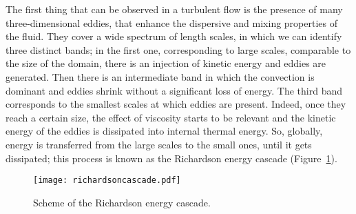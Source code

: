 The first thing that can be observed in a turbulent flow is the presence of 
many three-dimensional eddies, that enhance the dispersive and mixing 
properties 
of the fluid. 
They cover a wide spectrum of length scales, in which we can identify 
three distinct bands; in the first one, corresponding to large scales, 
comparable to the size of the domain, there is an injection of kinetic energy 
and eddies are generated. Then there is an intermediate band in which the 
convection is dominant and eddies shrink without a significant loss of energy. 
The third band corresponds to the smallest scales at which eddies are present. 
Indeed, once they reach a certain size, the effect of viscosity starts to 
be relevant and the kinetic energy of the eddies is dissipated
into internal thermal energy. So, globally, energy is transferred from the 
large 
scales to the small ones, until it gets dissipated; this process is known as 
the Richardson energy cascade (Figure~\ref{fig:cascade}).
\begin{figure}%
	\centering
	\texttt{[image: richardsoncascade.pdf]}
	\caption[Richardson energy cascade]{Scheme of the Richardson energy 
	cascade.}
	\label{fig:cascade}
\end{figure}
%

